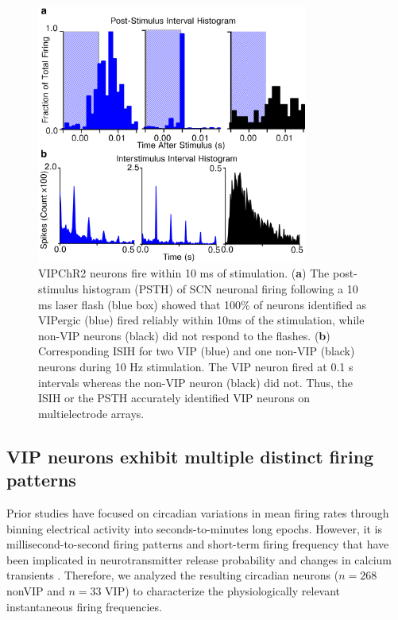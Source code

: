 \begin{figure}[p]
    \begin{center}
        \includegraphics[width=3.5in]{chap5/figures/SupplementaryFigure3.png}
    \end{center}
    \caption{\label{fig:cms3} 
        VIPChR2 neurons fire within 10 ms of  stimulation.
    (\textbf{a}) The post-stimulus histogram (PSTH) of SCN neuronal firing following a 10 ms laser flash (blue box) showed that 100\% of neurons identified as VIPergic (blue) fired reliably within 10ms of the stimulation, while non-VIP neurons (black) did not respond to the flashes. 
    (\textbf{b}) Corresponding ISIH for two VIP (blue) and one non-VIP (black) neurons during 10 Hz stimulation. The VIP neuron fired at 0.1 s intervals whereas the non-VIP neuron (black) did not. Thus, the ISIH or the PSTH accurately identified VIP neurons on multielectrode arrays.
    }
\end{figure}


\subsection*{VIP neurons exhibit multiple distinct firing patterns}

Prior studies have focused on circadian variations in mean firing rates through binning electrical activity into seconds-to-minutes long epochs.
However, it is millisecond-to-second firing patterns and short-term firing frequency that have been implicated in neurotransmitter release probability and changes in calcium transients \cite{Tsodyks1997, Neher2008}.
Therefore, we analyzed the resulting circadian neurons ($n=268$ nonVIP and $n=33$ VIP) to characterize the physiologically relevant instantaneous firing frequencies.

